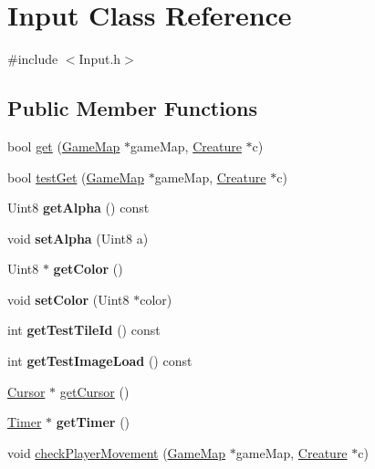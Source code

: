 \hypertarget{class_input}{}\section{Input Class Reference}
\label{class_input}


{\ttfamily \#include $<$Input.\+h$>$}

\subsection*{Public Member Functions}
\begin{DoxyCompactItemize}
\item 
bool \hyperlink{class_input_ae72c10b92311d7f335cc15a72c1d3682}{get} (\hyperlink{class_game_map}{Game\+Map} $\ast$game\+Map, \hyperlink{class_creature}{Creature} $\ast$c)
\item 
bool \hyperlink{class_input_ae5a7b046114b18cd234a43e3bc6500a3}{test\+Get} (\hyperlink{class_game_map}{Game\+Map} $\ast$game\+Map, \hyperlink{class_creature}{Creature} $\ast$c)
\item 
\hypertarget{class_input_a18cfa7a63c2354d5b467b6ee59e87d46}{}Uint8 {\bfseries get\+Alpha} () const \label{class_input_a18cfa7a63c2354d5b467b6ee59e87d46}

\item 
\hypertarget{class_input_a83ef8e0aafcc6880c692ed8edb1023d4}{}void {\bfseries set\+Alpha} (Uint8 a)\label{class_input_a83ef8e0aafcc6880c692ed8edb1023d4}

\item 
\hypertarget{class_input_acaff8427f74a7c56a3cf53a58c23d583}{}Uint8 $\ast$ {\bfseries get\+Color} ()\label{class_input_acaff8427f74a7c56a3cf53a58c23d583}

\item 
\hypertarget{class_input_aa226ff0e5f087bd8deef102263e73871}{}void {\bfseries set\+Color} (Uint8 $\ast$color)\label{class_input_aa226ff0e5f087bd8deef102263e73871}

\item 
\hypertarget{class_input_a00046e1e9ff727c0112765819abe717c}{}int {\bfseries get\+Test\+Tile\+Id} () const \label{class_input_a00046e1e9ff727c0112765819abe717c}

\item 
\hypertarget{class_input_a5982749083ffc44865f5452da8db6c78}{}int {\bfseries get\+Test\+Image\+Load} () const \label{class_input_a5982749083ffc44865f5452da8db6c78}

\item 
\hyperlink{class_cursor}{Cursor} $\ast$ \hyperlink{class_input_a1198fed427c40c4a4945352db61e3518}{get\+Cursor} ()
\item 
\hypertarget{class_input_a1bc956ef2dea0511a2820561072be0d8}{}\hyperlink{class_timer}{Timer} $\ast$ {\bfseries get\+Timer} ()\label{class_input_a1bc956ef2dea0511a2820561072be0d8}

\item 
void \hyperlink{class_input_a7b7cf488450f97ef78ee643a21007f69}{check\+Player\+Movement} (\hyperlink{class_game_map}{Game\+Map} $\ast$game\+Map, \hyperlink{class_creature}{Creature} $\ast$c)
\end{DoxyCompactItemize}


